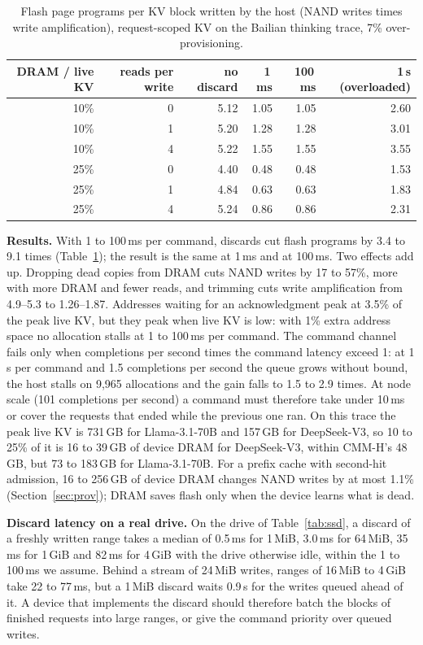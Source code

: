 \documentclass[acmsmall,screen,review]{acmart}
\begin{document}
\begin{table}[t]
\caption{Flash page programs per KV block written by the host (NAND writes times write
amplification), request-scoped KV on the Bailian thinking trace, 7\% over-provisioning.}
\label{tab:discard}
\small
\begin{tabular}{rrrrrr}
\toprule
DRAM / live KV & reads per write & no discard & 1\,ms & 100\,ms & 1\,s (overloaded) \\
\midrule
10\% & 0 & 5.12 & 1.05 & 1.05 & 2.60 \\
10\% & 1 & 5.20 & 1.28 & 1.28 & 3.01 \\
10\% & 4 & 5.22 & 1.55 & 1.55 & 3.55 \\
25\% & 0 & 4.40 & 0.48 & 0.48 & 1.53 \\
25\% & 1 & 4.84 & 0.63 & 0.63 & 1.83 \\
25\% & 4 & 5.24 & 0.86 & 0.86 & 2.31 \\
\bottomrule
\end{tabular}
\end{table}

\textbf{Results.} With 1 to 100\,ms per command, discards cut flash programs by 3.4 to 9.1 times
(Table~\ref{tab:discard}); the result is the same at 1\,ms and at 100\,ms. Two effects add up.
Dropping dead copies from DRAM cuts NAND writes by 17 to 57\%, more with more DRAM and fewer reads,
and trimming cuts write amplification from 4.9--5.3 to 1.26--1.87. Addresses waiting for an
acknowledgment peak at 3.5\% of the peak live KV, but they peak when live KV is low: with 1\% extra
address space no allocation stalls at 1 to 100\,ms per command. The command channel fails only when completions per second times the command latency
exceed 1: at 1\,s per command and 1.5 completions per second the queue grows without bound, the
host stalls on 9,965 allocations and the gain falls to 1.5 to 2.9 times. At node scale (101 completions per second) a
command must therefore take under 10\,ms or cover the requests that ended while the previous one ran. On this trace the peak live KV
is 731\,GB for Llama-3.1-70B and 157\,GB for DeepSeek-V3, so 10 to 25\% of it is 16 to 39\,GB of
device DRAM for DeepSeek-V3, within CMM-H's 48\,GB, but 73 to 183\,GB for Llama-3.1-70B. For a
prefix cache with second-hit admission, 16 to 256\,GB of device DRAM changes NAND writes by at most
1.1\% (Section~\ref{sec:prov}); DRAM saves flash only when the device learns what is dead.

\textbf{Discard latency on a real drive.} On the drive of Table~\ref{tab:ssd}, a discard of a freshly
written range takes a median of 0.5\,ms for 1\,MiB, 3.0\,ms for 64\,MiB, 35\,ms for 1\,GiB and
82\,ms for 4\,GiB with the drive otherwise idle, within the 1 to 100\,ms we assume. Behind a
stream of 24\,MiB writes, ranges of 16\,MiB to 4\,GiB take 22 to 77\,ms, but a 1\,MiB discard waits
0.9\,s for the writes queued ahead of it. A device that implements the discard should therefore batch
the blocks of finished requests into large ranges, or give the command priority over queued writes.
\end{document}
